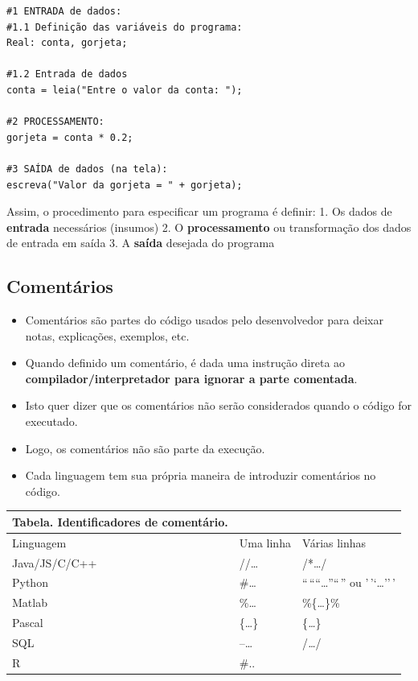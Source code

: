 \documentclass[12pt,a4paper]{article}
\providecommand{\tightlist}{%
      \setlength{\itemsep}{0pt}\setlength{\parskip}{0pt}}
\begin{document}
    \begin{verbatim}
#1 ENTRADA de dados:
#1.1 Definição das variáveis do programa:
Real: conta, gorjeta;

#1.2 Entrada de dados
conta = leia("Entre o valor da conta: ");

#2 PROCESSAMENTO:
gorjeta = conta * 0.2;

#3 SAÍDA de dados (na tela):
escreva("Valor da gorjeta = " + gorjeta);
\end{verbatim}

    Assim, o procedimento para especificar um programa é definir: 1. Os
dados de \textbf{entrada} necessários (insumos) 2. O
\textbf{processamento} ou transformação dos dados de entrada em saída 3.
A \textbf{saída} desejada do programa

    \hypertarget{comentuxe1rios}{%
\subsection{Comentários}\label{comentuxe1rios}}

    \begin{itemize}
\tightlist
\item
  Comentários são partes do código usados pelo desenvolvedor para deixar
  notas, explicações, exemplos, etc.
\item
  Quando definido um comentário, é dada uma instrução direta ao
  \textbf{compilador/interpretador para ignorar a parte comentada}.
\item
  Isto quer dizer que os comentários não serão considerados quando o
  código for executado.
\item
  Logo, os comentários não são parte da execução.
\item
  Cada linguagem tem sua própria maneira de introduzir comentários no
  código.
\end{itemize}

    \begin{longtable}[]{@{}lll@{}}
\toprule()
Tabela. Identificadores de comentário. & & \\
\midrule()
\endhead
Linguagem & Uma linha & Várias linhas \\
Java/JS/C/C++ & //\ldots{} & /*\ldots*/ \\
Python & \#\ldots{} & ``\,````\ldots{}''``\,'' ou '\,'`\ldots{}''\,' \\
Matlab & \%\ldots{} & \%\{\ldots\}\% \\
Pascal & \{\ldots\} & \{\emph{\ldots{}}\} \\
SQL & --\ldots{} & /\emph{\ldots{}}/ \\
R & \#.. & \\
\bottomrule()
\end{longtable}
\end{document}
